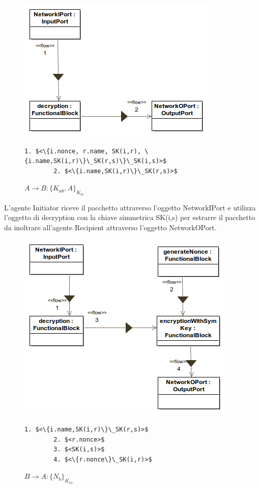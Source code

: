 \begin{figure}[h!] 
    \centering 
    \includegraphics[scale=0.6]{img/NSSK/FirstMessage.png} 
    \begin{lstlisting}[frame=single, mathescape, basicstyle=\footnotesize]
        1. $<\{i.nonce, r.name, SK(i,r), \{i.name,SK(i,r)\}\_SK(r,s)\}\_SK(i,s)>$
        2. $<\{i.name,SK(i,r)\}\_SK(r,s)>$
    \end{lstlisting}
    \caption{$A \rightarrow B : \{K_{ab}, A\}_{K_{bs}}$} 
\end{figure}
\noindent L'agente Initiator riceve il pacchetto attraverso l'oggetto NetworkIPort e utilizza l'oggetto di decryption con la chiave simmetrica SK(i,s) per estrarre il pacchetto da inoltrare all'agente Recipient attraverso l'oggetto NetworkOPort.\\
\begin{figure}[h!] 
    \centering 
    \includegraphics[scale=0.59]{img/NSSK/SecondMessage.png} 
    \begin{lstlisting}[frame=single, mathescape, basicstyle=\footnotesize]
        1. $<\{i.name,SK(i,r)\}\_SK(r,s)>$
        2. $<r.nonce>$
        3. $<SK(i,s)>$
        4. $<\{r.nonce\}\_SK(i,r)>$
    \end{lstlisting}
    \caption{$B \rightarrow A : \{N_b\}_{K_{as}}$} 
\end{figure}
